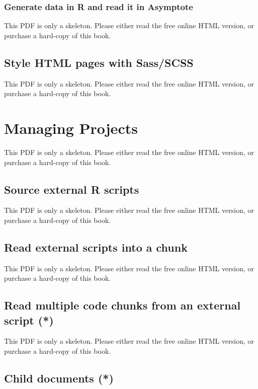 \documentclass[
  11pt,
]{krantz}
\begin{document}
\subsection{Generate data in R and read it in Asymptote}\label{generate-data-in-r-and-read-it-in-asymptote}

This PDF is only a skeleton. Please either read the free online HTML version, or purchase a hard-copy of this book.

\section{Style HTML pages with Sass/SCSS}\label{eng-sass}

This PDF is only a skeleton. Please either read the free online HTML version, or purchase a hard-copy of this book.

\chapter{Managing Projects}\label{managing-projects}

This PDF is only a skeleton. Please either read the free online HTML version, or purchase a hard-copy of this book.

\section{Source external R scripts}\label{source-script}

This PDF is only a skeleton. Please either read the free online HTML version, or purchase a hard-copy of this book.

\section{Read external scripts into a chunk}\label{option-code}

This PDF is only a skeleton. Please either read the free online HTML version, or purchase a hard-copy of this book.

\section{Read multiple code chunks from an external script (*)}\label{read-chunk}

This PDF is only a skeleton. Please either read the free online HTML version, or purchase a hard-copy of this book.

\section{Child documents (*)}\label{child-document}
\end{document}
